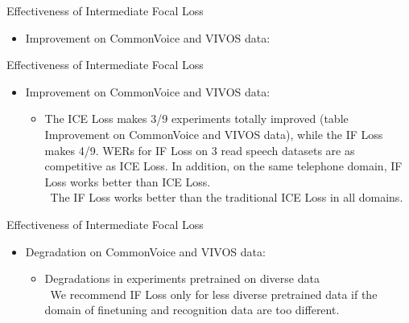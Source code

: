 \begin{frame}{Effectiveness of Intermediate Focal Loss}
\begin{itemize}
    \item Improvement on CommonVoice and VIVOS data:
\end{itemize}

\end{frame}


\begin{frame}{Effectiveness of Intermediate Focal Loss}
\begin{itemize}
    \item Improvement on CommonVoice and VIVOS data:
    \begin{itemize}
        \item The ICE Loss makes 3/9 experiments totally improved (table Improvement on CommonVoice and VIVOS data), while the IF Loss makes 4/9.
        WERs for IF Loss on 3 read speech datasets are as competitive as ICE Loss.
        In addition, on the same telephone domain, IF Loss works better than ICE Loss.
        \\ \textrightarrow \,
        The IF Loss works better than the traditional ICE Loss in all domains.
    \end{itemize}
\end{itemize}
\end{frame}


\begin{frame}{Effectiveness of Intermediate Focal Loss}
\begin{itemize}
    \item Degradation on CommonVoice and VIVOS data:
    
    \begin{itemize}
        \item Degradations in experiments pretrained on diverse data
        \\ \textrightarrow \,
        We recommend IF Loss only for less diverse pretrained data if the domain of finetuning and recognition data are too different.
    \end{itemize}
\end{itemize}
\end{frame}
